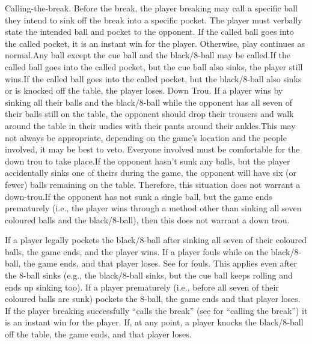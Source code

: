 
Calling-the-break. Before the break, the player breaking may call a specific ball they intend to sink off the break into a specific pocket. The player must verbally state the intended ball and pocket to the opponent. If the called ball goes into the called pocket, it is an instant win for the player. Otherwise, play continues as normal.\standardspace Any ball except the cue ball and the black/8-ball may be called.\standardspace If the called ball goes into the called pocket, but the cue ball also sinks, the player still wins.\standardspace If the called ball goes into the called pocket, but the black/8-ball also sinks or is knocked off the table, the player loses.%
 Down Trou. If a player wins by sinking all their balls and the black/8-ball while the opponent has all seven of their balls still on the table, the opponent should drop their trousers and walk around the table in their undies with their pants around their ankles.\standardspace This may not always be appropriate, depending on the game's location and the people involved, it may be best to veto. Everyone involved must be comfortable for the down trou to take place.\standardspace If the opponent hasn't sunk any balls, but the player accidentally sinks one of theirs during the game, the opponent will have six (or fewer) balls remaining on the table. Therefore, this situation does not warrant a down-trou.\standardspace If the opponent has not sunk a single ball, but the game ends prematurely (i.e., the player wins through a method other than sinking all seven coloured balls and the black/8-ball), then this does not warrant a down trou.%


 If a player legally pockets the black/8-ball after sinking all seven of their coloured balls, the game ends, and the player wins.%
 If a player fouls while on the black/8-ball, the game ends, and that player loses. See  for fouls. This applies even after the 8-ball sinks (e.g., the black/8-ball sinks, but the cue ball keeps rolling and ends up sinking too).%
 If a player prematurely (i.e., before all seven of their coloured balls are sunk) pockets the 8-ball, the game ends and that player loses.%
 If the player breaking successfully “calls the break” (see  for “calling the break”) it is an instant win for the player.%
 If, at any point, a player knocks the black/8-ball off the table, the game ends, and that player loses.%
 {}%
 {}%
 {}%

